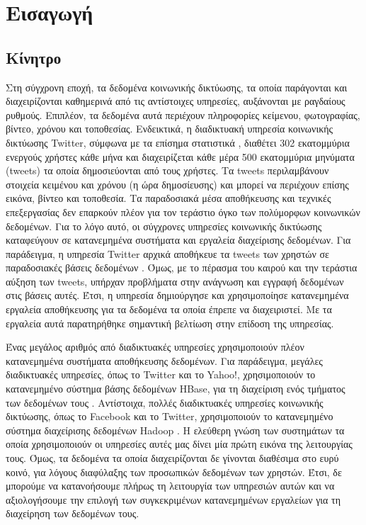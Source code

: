\chapter{Εισαγωγή}

\section{Κίνητρο}

Στη σύγχρονη εποχή, τα δεδομένα κοινωνικής δικτύωσης, τα οποία παράγονται και  
διαχειρίζονται καθημερινά από τις αντίστοιχες υπηρεσίες, αυξάνονται με ραγδαίους ρυθμούς. 
Επιπλέον, τα δεδομένα αυτά περιέχουν πληροφορίες κείμενου, φωτογραφίας, βίντεο, χρόνου και τοποθεσίας. Ενδεικτικά, η διαδικτυακή υπηρεσία κοινωνικής δικτύωσης Twitter, 
σύμφωνα με τα επίσημα στατιστικά \cite{1}, διαθέτει 302 εκατομμύρια ενεργούς χρήστες κάθε μήνα και διαχειρίζεται κάθε μέρα 500 εκατομμύρια μηνύματα (tweets) 
τα οποία δημοσιεύονται από τους χρήστες. Τα tweets περιλαμβάνουν στοιχεία κειμένου και χρόνου (η ώρα δημοσίευσης) και μπορεί να περιέχουν επίσης 
εικόνα, βίντεο και \linebreak τοποθεσία. Τα παραδοσιακά μέσα αποθήκευσης και τεχνικές επεξεργασίας δεν επαρκούν πλέον για τον τεράστιο όγκο των πολύμορφων 
κοινωνικών δεδομένων. Για το λόγο αυτό, οι σύγχρονες υπηρεσίες κοινωνικής δικτύωσης 
καταφεύγουν σε κατανεμημένα συστήματα και εργαλεία διαχείρισης δεδομένων. Για παράδειγμα, η υπηρεσία Twitter αρχικά 
αποθήκευε τα tweets των χρηστών σε \linebreak παραδοσιακές βάσεις δεδομένων \cite{2}. Όμως, με το πέρασμα του καιρού και την τεράστια αύξηση των 
tweets, υπήρχαν προβλήματα στην ανάγνωση και εγγραφή δεδομένων στις βάσεις αυτές. Έτσι, η υπηρεσία δημιούργησε και χρησιμοποίησε κατανεμημένα εργαλεία αποθήκευσης 
για τα δεδομένα τα οποία έπρεπε να διαχειριστεί. Με τα εργαλεία αυτά παρατηρήθηκε σημαντική βελτίωση στην επίδοση της υπηρεσίας. 

Ένας μεγάλος αριθμός από διαδικτυακές υπηρεσίες χρησιμοποιούν πλέον κατανεμημένα \linebreak συστήματα αποθήκευσης δεδομένων. Για παράδειγμα, μεγάλες διαδικτυακές 
υπηρεσίες, όπως το Twitter και το Yahoo!, χρησιμοποιούν το κατανεμημένο σύστημα βάσης δεδομένων HBase, για τη διαχείριση 
ενός τμήματος των δεδομένων τους \cite{4}. Αντίστοιχα, πολλές διαδικτυακές υπηρεσίες κοινωνικής δικτύωσης, όπως το Facebook και το Twitter, 
χρησιμοποιούν το \linebreak κατανεμημένο σύστημα διαχείρισης δεδομένων Hadoop \cite{6}. Η ελεύθερη γνώση των \linebreak 
συστημάτων τα οποία χρησιμοποιούν οι 
υπηρεσίες αυτές μας δίνει μία πρώτη εικόνα της \linebreak 
λειτουργίας τους. Όμως, τα δεδομένα τα οποία διαχειρίζονται δε γίνονται διαθέσιμα στο ευρύ κοινό, για λόγους 
διαφύλαξης των προσωπικών δεδομένων των χρηστών. Έτσι, δε μπορούμε να \linebreak κατανοήσουμε πλήρως τη λειτουργία των υπηρεσιών αυτών και να αξιολογήσουμε την επιλογή 
των συγκεκριμένων κατανεμημένων εργαλείων για τη διαχείρηση των δεδομένων τους. 

